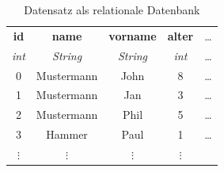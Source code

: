 \begin{frame}
\begin{columns}[T,onlytextwidth]
        \pause

        \begin{table}
            \centering
            \begin{adjustbox}{width=\textwidth}
                \small
                \begin{tabular}[c]{|c|c|c|c|c}

                    \hline

                    \multicolumn{1}{|c|}{\textbf{id}} &
                    \multicolumn{1}{c|}{\textbf{name}} &
                    \multicolumn{1}{c|}{\textbf{vorname}} &
                    \multicolumn{1}{c|}{\textbf{alter}} &
                    \multicolumn{1}{c}{\dots} \\

                    \multicolumn{1}{|c|}{\textit{int}} &
                    \multicolumn{1}{c|}{\textit{String}} &
                    \multicolumn{1}{c|}{\textit{String}} &
                    \multicolumn{1}{c|}{\textit{int}} &
                    \multicolumn{1}{c}{\dots} \\

                    \hline

                    0  & Mustermann  & John   & 8   & \dots \\
                    1  & Mustermann  & Jan    & 3   & \dots \\
                    2  & Mustermann  & Phil   & 5   & \dots \\
                    3  & Hammer      & Paul   & 1   & \dots \\
                    $\vdots$ & $\vdots$ & $\vdots$ & $\vdots$ &

                \end{tabular}
            \end{adjustbox}
            \caption{Datensatz  als relationale Datenbank}
            \label{tab:kinder1}
        \end{table}

    \end{columns}
\end{frame}

